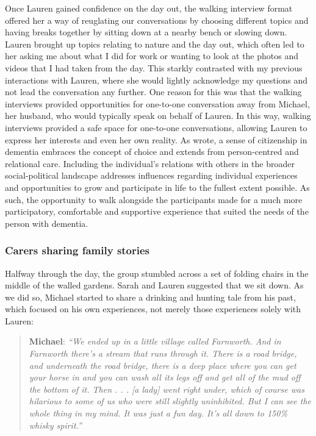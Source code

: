 Once Lauren gained confidence on the day out, the walking interview format offered her a way of reuglating our conversations by choosing different topics and having breaks together by sitting down at a nearby bench or slowing down. Lauren brought up topics relating to nature and the day out, which often led to her asking me about what I did for work or wanting to look at the photos and videos that I had taken from the day. This starkly contrasted with my previous interactions with Lauren, where she would lightly acknowledge my questions and not lead the conversation any further. One reason for this was that the walking interviews provided opportunities for one-to-one conversation away from Michael, her husband, who would typically speak on behalf of Lauren. In this way, walking interviews provided a safe space for one-to-one conversations, allowing Lauren to express her interests and even her own reality. As \cite{bartlett_citizenship_2014} wrote, a sense of citizenship in dementia embraces the concept of choice and extends from person-centred and relational care. Including the individual's relations with others in the broader social-political landscape addresses influences regarding individual experiences and opportunities to grow and participate in life to the fullest extent possible. As such, the opportunity to walk alongside the participants made for a much more participatory, comfortable and supportive experience that suited the needs of the person with dementia.

\subsubsection{Carers sharing family stories}
Halfway through the day, the group stumbled across a set of folding chairs in the middle of the walled gardens. Sarah and Lauren suggested that we sit down. As we did so, Michael started to share a drinking and hunting tale from his past, which focused on his own experiences, not merely those experiences solely with Lauren:

\begin{quote}
\textbf{Michael}:\textit{    ``We ended up in a little village called Farnworth. And in Farnworth there's a stream that runs through it. There is a road bridge, and underneath the road bridge, there is a deep place where you can get your horse in and you can wash all its legs off and get all of the mud off the bottom of it. Then . . . [a lady] went right under, which of course was hilarious to some of us who were still slightly uninhibited. But I can see the whole thing in my mind. It was just a fun day. It's all down to 150\% whisky spirit.''
}\end{quote}

